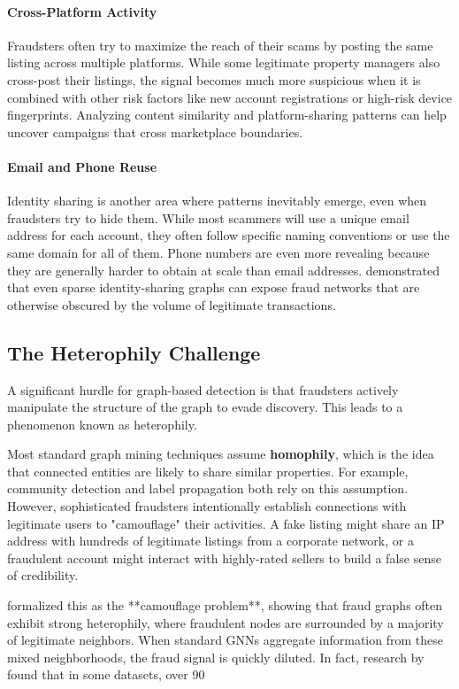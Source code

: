 \paragraph{Cross-Platform Activity}
Fraudsters often try to maximize the reach of their scams by posting the same listing across multiple platforms. While some legitimate property managers also cross-post their listings, the signal becomes much more suspicious when it is combined with other risk factors like new account registrations or high-risk device fingerprints. Analyzing content similarity and platform-sharing patterns can help uncover campaigns that cross marketplace boundaries.

\paragraph{Email and Phone Reuse}
Identity sharing is another area where patterns inevitably emerge, even when fraudsters try to hide them. While most scammers will use a unique email address for each account, they often follow specific naming conventions or use the same domain for all of them. Phone numbers are even more revealing because they are generally harder to obtain at scale than email addresses. \citeauthor{hooi2016fraudar} \cite{hooi2016fraudar} demonstrated that even sparse identity-sharing graphs can expose fraud networks that are otherwise obscured by the volume of legitimate transactions.

\subsection{The Heterophily Challenge}

A significant hurdle for graph-based detection is that fraudsters actively manipulate the structure of the graph to evade discovery. This leads to a phenomenon known as heterophily.

Most standard graph mining techniques assume \textbf{homophily}, which is the idea that connected entities are likely to share similar properties. For example, community detection and label propagation both rely on this assumption. However, sophisticated fraudsters intentionally establish connections with legitimate users to "camouflage" their activities. A fake listing might share an IP address with hundreds of legitimate listings from a corporate network, or a fraudulent account might interact with highly-rated sellers to build a false sense of credibility.

\citeauthor{dou2020enhancing} \cite{dou2020enhancing} formalized this as the **camouflage problem**, showing that fraud graphs often exhibit strong heterophily, where fraudulent nodes are surrounded by a majority of legitimate neighbors. When standard GNNs aggregate information from these mixed neighborhoods, the fraud signal is quickly diluted. In fact, research by \citeauthor{liu2020alleviating} \cite{liu2020alleviating} found that in some datasets, over 90%

